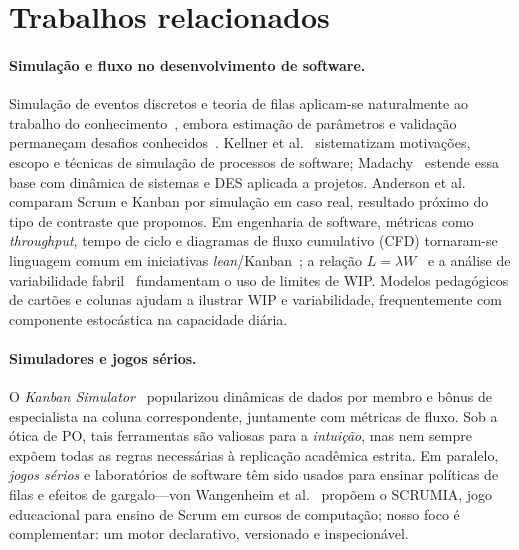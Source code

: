 \section{Trabalhos relacionados}
\label{sec:relacionados}

\paragraph{Simulação e fluxo no desenvolvimento de software.}
Simulação de eventos discretos e teoria de filas aplicam-se naturalmente ao trabalho do conhecimento~\cite{banks2010discrete,chwif2014modelagem}, embora estimação de parâmetros e validação permaneçam desafios conhecidos~\cite{kellner1999software}. Kellner et al.~\cite{kellner1999software} sistematizam motivações, escopo e técnicas de simulação de processos de software; Madachy~\cite{madachy2008software} estende essa base com dinâmica de sistemas e DES aplicada a projetos. Anderson et al.~\cite{anderson2012comparative} comparam Scrum e Kanban por simulação em caso real, resultado próximo do tipo de contraste que propomos. Em engenharia de software, métricas como \emph{throughput}, tempo de ciclo e diagramas de fluxo cumulativo (CFD) tornaram-se linguagem comum em iniciativas \emph{lean}/Kanban~\cite{anderson2010kanban}; a relação $L=\lambda W$~\cite{little1961proof} e a análise de variabilidade fabril~\cite{hopp2008factory,reinertsen2009principles} fundamentam o uso de limites de WIP. Modelos pedagógicos de cartões e colunas ajudam a ilustrar WIP e variabilidade, frequentemente com componente estocástica na capacidade diária.

\paragraph{Simuladores e jogos sérios.}
O \emph{Kanban Simulator}~\cite{kanbanSimulator} popularizou dinâmicas de dados por membro e bônus de especialista na coluna correspondente, juntamente com métricas de fluxo. Sob a ótica de PO, tais ferramentas são valiosas para a \emph{intuição}, mas nem sempre expõem todas as regras necessárias à replicação acadêmica estrita. Em paralelo, \emph{jogos sérios} e laboratórios de software têm sido usados para ensinar políticas de filas e efeitos de gargalo---von Wangenheim et al.~\cite{vonwangenheim2013scrumia} propõem o SCRUMIA, jogo educacional para ensino de Scrum em cursos de computação; nosso foco é complementar: um motor declarativo, versionado e inspecionável.

